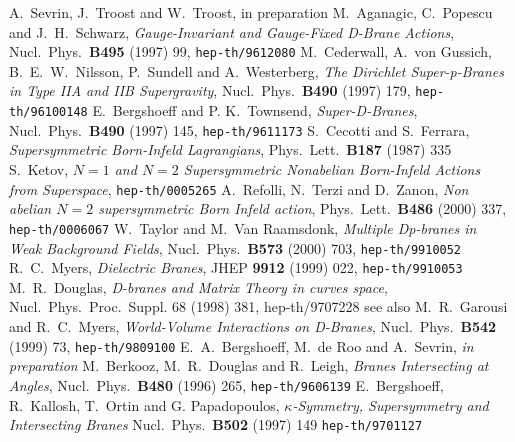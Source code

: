 \documentclass[12pt,a4paper]{article}
\begin{document}
\begin{thebibliography}{99}
  A.~Sevrin, J.~Troost and W.~Troost,  in preparation
  M.~Aganagic, C.~Popescu and J.~H.~Schwarz,
               {\it Gauge-Invariant and Gauge-Fixed D-Brane Actions},
               Nucl.~Phys.~{\bf B495} (1997) 99,
               {\tt hep-th/9612080}
  M.~Cederwall, A.~von Gussich, B.~E.~W.~Nilsson,
                P.~Sundell and A.~Westerberg,
               {\it The Dirichlet Super-p-Branes in Type IIA and IIB
                   Supergravity},
               Nucl.~Phys.~{\bf B490} (1997) 179,
               {\tt hep-th/96100148}
   E.~Bergshoeff and P. K.~Townsend,
               {\it Super-D-Branes},
               Nucl.~Phys.~{\bf B490} (1997) 145,
               {\tt hep-th/9611173}
   S.~Cecotti and S.~Ferrara,
               {\it Supersymmetric Born-Infeld Lagrangians},
               Phys.~Lett.~{\bf B187} (1987) 335
   S.~Ketov,
               {\it $N=1$ and $N=2$ Supersymmetric Nonabelian
                   Born-Infeld Actions from Superspace},
               {\tt hep-th/0005265}
  A.~Refolli, N.~Terzi and D.~Zanon,
               {\it Non abelian $N=2$ supersymmetric Born Infeld
                   action},
               Phys.~Lett.~{\bf B486} (2000) 337,
               {\tt hep-th/0006067}
   W.~Taylor and M.~Van Raamsdonk,
               {\it Multiple Dp-branes in Weak Background Fields},
               Nucl.~Phys.~{\bf B573} (2000) 703,
               {\tt hep-th/9910052}
    R.~C.~Myers,
               {\it Dielectric Branes},
               JHEP {\bf 9912} (1999) 022,\hfill\break
               {\tt hep-th/9910053}
    M.~R.~Douglas,
               {\it D-branes and Matrix Theory in curves space},
               Nucl.~Phys.~Proc.~Suppl. 68 (1998) 381,
               {hep-th/9707228}
               see also
               M.~R.~Garousi and R.~C.~Myers,
               {\it World-Volume Interactions on D-Branes},
               Nucl.~Phys.~{\bf B542} (1999) 73,
               {\tt hep-th/9809100}
 E.~A.~Bergshoeff, M.~de Roo and A.~Sevrin,
               {\it in preparation}
  M.~Berkooz, M.~R.~Douglas and R.~Leigh,
               {\it Branes Intersecting at Angles},
               Nucl.~Phys.~{\bf B480} (1996) 265,
               {\tt hep-th/9606139}
 E.~Bergshoeff, R.~Kallosh, T.~Ortin and G. Papadopoulos,
               {\it $\kappa$-Symmetry, Supersymmetry and Intersecting
               Branes}
               Nucl.~Phys.~{\bf B502} (1997) 149
               {\tt hep-th/9701127}



\end{thebibliography}
\end{document}
